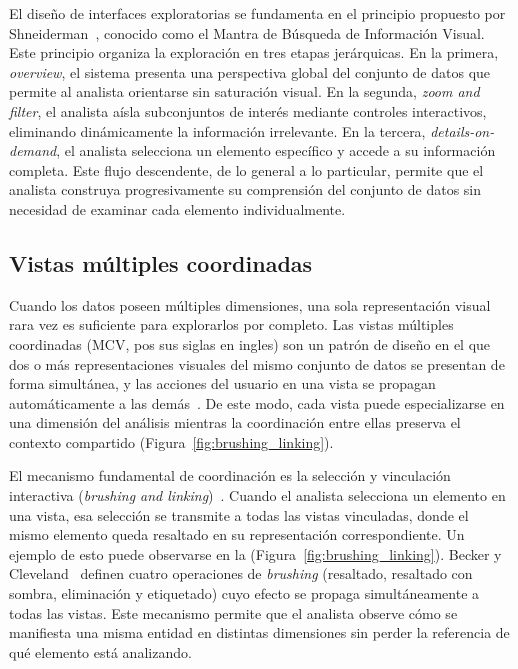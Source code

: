 El diseño de interfaces exploratorias se fundamenta en 
el principio propuesto por 
Shneiderman~\cite{shneiderman1996eyes}, conocido como 
el Mantra de Búsqueda de Información Visual. Este 
principio organiza la exploración en tres etapas 
jerárquicas. En la primera, \textit{overview}, el 
sistema presenta una perspectiva global del conjunto 
de datos que permite al analista orientarse sin 
saturación visual. En la segunda, \textit{zoom and 
filter}, el analista aísla subconjuntos de interés 
mediante controles interactivos, eliminando 
dinámicamente la información irrelevante. En la 
tercera, \textit{details-on-demand}, el analista 
selecciona un elemento específico y accede a su 
información completa. Este flujo descendente, de lo 
general a lo particular, permite que el analista 
construya progresivamente su comprensión del conjunto 
de datos sin necesidad de examinar cada elemento 
individualmente.


\subsection{Vistas múltiples coordinadas}
\label{sec:mcv}

Cuando los datos poseen múltiples dimensiones, una sola 
representación visual rara vez es suficiente para 
explorarlos por completo. Las vistas múltiples coordinadas (\acs{MCV}, pos sus siglas en ingles) son un patrón de 
diseño en el que dos o más representaciones visuales del 
mismo conjunto de datos se presentan de forma simultánea, 
y las acciones del usuario en una vista se propagan 
automáticamente a las 
demás~\cite{roberts2007state, baldonado2000guidelines}. 
De este modo, cada vista puede especializarse en una 
dimensión del análisis mientras la coordinación entre 
ellas preserva el contexto compartido 
(Figura~\ref{fig:brushing_linking}).

El mecanismo fundamental de coordinación es la selección y vinculación interactiva 
(\textit{brushing and linking})~\cite{becker1987brushing}. 
Cuando el analista selecciona un elemento en una vista, 
esa selección se transmite a todas las vistas vinculadas, 
donde el mismo elemento queda resaltado en su 
representación correspondiente. Un ejemplo de esto puede observarse en la 
(Figura~\ref{fig:brushing_linking}). 
Becker y Cleveland~\cite{becker1987brushing} definen 
cuatro operaciones de \textit{brushing} (resaltado, 
resaltado con sombra, eliminación y etiquetado) cuyo 
efecto se propaga simultáneamente a todas las vistas. 
Este mecanismo permite que el analista observe cómo se 
manifiesta una misma entidad en distintas dimensiones 
sin perder la referencia de qué elemento está analizando.

